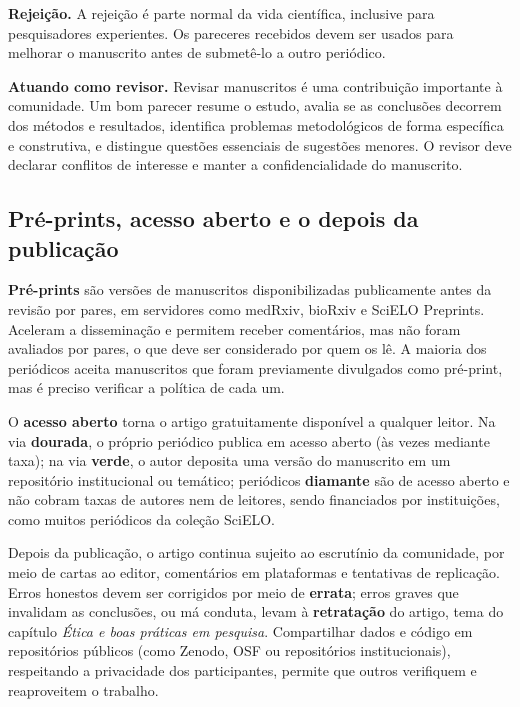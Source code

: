\documentclass[
]{book}
\begin{document}
\textbf{Rejeição.} A rejeição é parte normal da vida científica, inclusive para pesquisadores experientes. Os pareceres recebidos devem ser usados para melhorar o manuscrito antes de submetê-lo a outro periódico.

\textbf{Atuando como revisor.} Revisar manuscritos é uma contribuição importante à comunidade. Um bom parecer resume o estudo, avalia se as conclusões decorrem dos métodos e resultados, identifica problemas metodológicos de forma específica e construtiva, e distingue questões essenciais de sugestões menores. O revisor deve declarar conflitos de interesse e manter a confidencialidade do manuscrito.

\subsection{Pré-prints, acesso aberto e o depois da publicação}\label{pruxe9-prints-acesso-aberto-e-o-depois-da-publicauxe7uxe3o}

\textbf{Pré-prints} são versões de manuscritos disponibilizadas publicamente antes da revisão por pares, em servidores como medRxiv, bioRxiv e SciELO Preprints. Aceleram a disseminação e permitem receber comentários, mas não foram avaliados por pares, o que deve ser considerado por quem os lê. A maioria dos periódicos aceita manuscritos que foram previamente divulgados como pré-print, mas é preciso verificar a política de cada um.

O \textbf{acesso aberto} torna o artigo gratuitamente disponível a qualquer leitor. Na via \textbf{dourada}, o próprio periódico publica em acesso aberto (às vezes mediante taxa); na via \textbf{verde}, o autor deposita uma versão do manuscrito em um repositório institucional ou temático; periódicos \textbf{diamante} são de acesso aberto e não cobram taxas de autores nem de leitores, sendo financiados por instituições, como muitos periódicos da coleção SciELO.

Depois da publicação, o artigo continua sujeito ao escrutínio da comunidade, por meio de cartas ao editor, comentários em plataformas e tentativas de replicação. Erros honestos devem ser corrigidos por meio de \textbf{errata}; erros graves que invalidam as conclusões, ou má conduta, levam à \textbf{retratação} do artigo, tema do capítulo \emph{Ética e boas práticas em pesquisa}. Compartilhar dados e código em repositórios públicos (como Zenodo, OSF ou repositórios institucionais), respeitando a privacidade dos participantes, permite que outros verifiquem e reaproveitem o trabalho.
\end{document}

